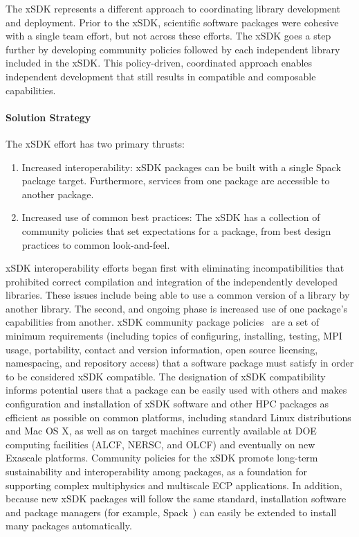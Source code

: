 The xSDK represents a different approach to coordinating library development and deployment.  Prior to the xSDK, scientific software packages were cohesive with a single team effort, but not across these efforts. The xSDK goes a step further by developing community policies followed by each independent library included in the xSDK.  This policy-driven, coordinated approach enables independent development that still results in compatible and composable capabilities.

\paragraph{Solution Strategy}

The xSDK effort has two primary thrusts:
\begin{enumerate}
	\item Increased interoperability: xSDK packages can be built with a single Spack package target.  Furthermore, services from one package are accessible to another package.
	\item Increased use of common best practices: The xSDK has a collection of community policies that set expectations for a package, from best design practices to common look-and-feel.
\end{enumerate}

xSDK interoperability efforts began first with eliminating incompatibilities that prohibited correct compilation and integration of the independently developed libraries.  These issues include being able to use a common version of a library by another library.  The second, and ongoing phase is increased use of one package's capabilities from another. xSDK community package policies~\cite{xsdk-policies:homepage,xsdk-policies:github} are a set of minimum requirements (including topics of configuring, installing, testing, MPI usage, portability, contact and version information, open source licensing, namespacing, and repository access) that a software package must satisfy in order to be considered xSDK compatible. The designation of xSDK compatibility informs potential users that a package can be easily used with others and makes configuration and installation of xSDK software and other HPC packages as efficient as possible on common platforms, including standard Linux distributions and Mac OS X, as well as on target machines currently available at DOE computing facilities (ALCF, NERSC, and OLCF) and eventually on new Exascale platforms.
Community policies for the xSDK promote long-term sustainability and interoperability among packages, as a foundation for supporting complex multiphysics and multiscale ECP applications. In addition, because new xSDK packages will follow the same standard, installation software and package managers (for example, Spack~\cite{gamblin+:sc15}) can easily be extended to install many packages automatically.

